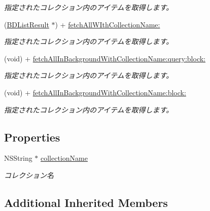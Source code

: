 \begin{DoxyCompactItemize}
\begin{DoxyCompactList}\small\item\em 指定されたコレクション内のアイテムを取得します。 \end{DoxyCompactList}\item 
(\hyperlink{interface_b_d_list_result}{B\-D\-List\-Result} $\ast$) + \hyperlink{interface_b_d_item_aafe068a317f7ac5af3e04ed842c3558e}{fetch\-All\-W\-Ith\-Collection\-Name\-:}
\begin{DoxyCompactList}\small\item\em 指定されたコレクション内のアイテムを取得します。 \end{DoxyCompactList}\item 
(void) + \hyperlink{interface_b_d_item_a474f0fcf5db1e2d7a94512a0955aa83b}{fetch\-All\-In\-Background\-With\-Collection\-Name\-:query\-:block\-:}
\begin{DoxyCompactList}\small\item\em 指定されたコレクション内のアイテムを取得します。 \end{DoxyCompactList}\item 
(void) + \hyperlink{interface_b_d_item_a8bc04dc179e76e77ba295ed4ea3e3466}{fetch\-All\-In\-Background\-With\-Collection\-Name\-:block\-:}
\begin{DoxyCompactList}\small\item\em 指定されたコレクション内のアイテムを取得します。 \end{DoxyCompactList}\end{DoxyCompactItemize}
\subsection*{Properties}
\begin{DoxyCompactItemize}
\item 
\hypertarget{interface_b_d_item_a2ecb76196ee2b904b36e9d4fe3448d7d}{N\-S\-String $\ast$ \hyperlink{interface_b_d_item_a2ecb76196ee2b904b36e9d4fe3448d7d}{collection\-Name}}\label{interface_b_d_item_a2ecb76196ee2b904b36e9d4fe3448d7d}

\begin{DoxyCompactList}\small\item\em コレクション名 \end{DoxyCompactList}\end{DoxyCompactItemize}
\subsection*{Additional Inherited Members}


